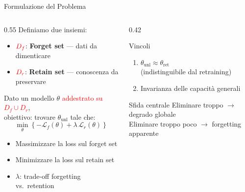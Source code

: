\documentclass[aspectratio=169,11pt]{beamer}
\begin{document}
\begin{frame}{Formulazione del Problema}
  \begin{columns}[T]
    \begin{column}{0.55\textwidth}
      Definiamo due insiemi:
      \begin{itemize}
        \item $\textcolor{red}{D_f}$: \textbf{Forget set} — dati da dimenticare
        \item $\textcolor{red}{D_r}$: \textbf{Retain set} — conoscenza da preservare
      \end{itemize}
      \vspace{0.4em}
      Dato un modello $\theta$ \textcolor{red}{addestrato su $D_f \cup D_r$},\\
      obiettivo: trovare $\theta_{\mathrm{unl}}$ tale che:
      \[
        \min_{\theta} \left\{
          -\mathcal{L}_f(\theta) + \lambda\,\mathcal{L}_r(\theta)
        \right\}
      \]
      \begin{itemize}
        \item Massimizzare la loss sul forget set
        \item Minimizzare la loss sul retain set
        \item $\lambda$: trade-off forgetting vs.\ retention
      \end{itemize}
    \end{column}
    \begin{column}{0.42\textwidth}
      \begin{block}{Vincoli}
        \begin{enumerate}
          \item $\theta_{\mathrm{unl}} \approx \theta_{\mathrm{ret}}$\\
                {\small (indistinguibile dal retraining)}
          \item Invarianza delle capacità generali
        \end{enumerate}
      \end{block}
      \vspace{0.5em}
      \begin{exampleblock}{Sfida centrale}
        Eliminare troppo $\rightarrow$ degrado globale\\
        Eliminare troppo poco $\rightarrow$ forgetting apparente
      \end{exampleblock}
    \end{column}
  \end{columns}
\end{frame}
\end{document}
